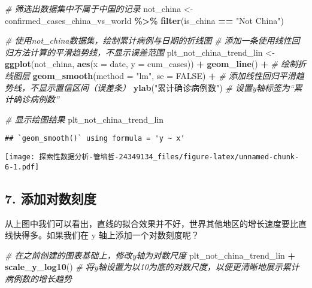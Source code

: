 \documentclass[
]{article}
\newenvironment{Shaded}{\begin{snugshade}}{\end{snugshade}}
\newcommand{\AttributeTok}[1]{\textcolor[rgb]{0.13,0.29,0.53}{#1}}
\newcommand{\CommentTok}[1]{\textcolor[rgb]{0.56,0.35,0.01}{\textit{#1}}}
\newcommand{\ConstantTok}[1]{\textcolor[rgb]{0.56,0.35,0.01}{#1}}
\newcommand{\FunctionTok}[1]{\textcolor[rgb]{0.13,0.29,0.53}{\textbf{#1}}}
\newcommand{\NormalTok}[1]{#1}
\newcommand{\OtherTok}[1]{\textcolor[rgb]{0.56,0.35,0.01}{#1}}
\newcommand{\SpecialCharTok}[1]{\textcolor[rgb]{0.81,0.36,0.00}{\textbf{#1}}}
\newcommand{\StringTok}[1]{\textcolor[rgb]{0.31,0.60,0.02}{#1}}
\begin{document}
\begin{Shaded}
\begin{Highlighting}[]
\CommentTok{\# 筛选出数据集中不属于中国的记录}
\NormalTok{not\_china }\OtherTok{\textless{}{-}}\NormalTok{ confirmed\_cases\_china\_vs\_world }\SpecialCharTok{\%\textgreater{}\%}
  \FunctionTok{filter}\NormalTok{(is\_china }\SpecialCharTok{==} \StringTok{"Not China"}\NormalTok{)}

\CommentTok{\# 使用not\_china数据集，绘制累计病例与日期的折线图}
\CommentTok{\# 添加一条使用线性回归方法计算的平滑趋势线，不显示误差范围}
\NormalTok{plt\_not\_china\_trend\_lin }\OtherTok{\textless{}{-}} \FunctionTok{ggplot}\NormalTok{(not\_china, }\FunctionTok{aes}\NormalTok{(}\AttributeTok{x =}\NormalTok{ date, }\AttributeTok{y =}\NormalTok{ cum\_cases)) }\SpecialCharTok{+}
  \FunctionTok{geom\_line}\NormalTok{() }\SpecialCharTok{+}  \CommentTok{\# 绘制折线图层}
  \FunctionTok{geom\_smooth}\NormalTok{(}\AttributeTok{method =} \StringTok{"lm"}\NormalTok{, }\AttributeTok{se =} \ConstantTok{FALSE}\NormalTok{) }\SpecialCharTok{+}  \CommentTok{\# 添加线性回归平滑趋势线，不显示置信区间（误差条）}
  \FunctionTok{ylab}\NormalTok{(}\StringTok{"累计确诊病例数"}\NormalTok{)  }\CommentTok{\# 设置y轴标签为“累计确诊病例数”}

\CommentTok{\# 显示绘图结果}
\NormalTok{plt\_not\_china\_trend\_lin }
\end{Highlighting}
\end{Shaded}

\begin{verbatim}
## `geom_smooth()` using formula = 'y ~ x'
\end{verbatim}

\texttt{[image: 探索性数据分析-管培哲-24349134\_files/figure-latex/unnamed-chunk-6-1.pdf]}

\subsection{7. 添加对数刻度}\label{ux6dfbux52a0ux5bf9ux6570ux523bux5ea6}

从上图中我们可以看出，直线的拟合效果并不好，世界其他地区的增长速度要比直线快得多。如果我们在
y 轴上添加一个对数刻度呢？

\begin{Shaded}
\begin{Highlighting}[]
\CommentTok{\# 在之前创建的图表基础上，修改y轴为对数尺度}
\NormalTok{plt\_not\_china\_trend\_lin }\SpecialCharTok{+} 
  \FunctionTok{scale\_y\_log10}\NormalTok{()  }\CommentTok{\# 将y轴设置为以10为底的对数尺度，以便更清晰地展示累计病例数的增长趋势}
\end{Highlighting}
\end{Shaded}
\end{document}
